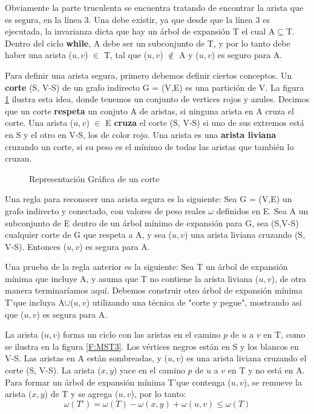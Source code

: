 \documentclass[a4paper, 11pt]{report}
\newcommand{\DrawEJcGraph}[5]{

    \begin{scope}[#4]
    \foreach \pos/\nodo in {{(0,0)/4}, {(0,2.2)/5}, {(1.5,1.7)/7}, {(3,3)/1}, {(3,1)/0}, {(4.5,1.7)/2}, {(4.5,3)/3}, {(7,0)/6}}
        \node[vertex] (#3\nodo) at \pos {\nodo};
    \foreach \start/\end in {4/5, 5/7, 7/1,7/0,0/2,2/3,2/6,4/7,1/5,0/4,1/2,1/3,2/7,3/6,6/0,6/4}
        \path[edge,#5] (#3\start) -- (#3\end);

    \foreach \nodo in {#1}
        \node[selected vertex] at (#3\nodo) {\nodo};

    \begin{pgfonlayer}{background}
        \foreach \start/\end in {#2}
            \path[selected edge,#5] (#3\start) -- (#3\end);
    \end{pgfonlayer}
    \end{scope}

}
\begin{document}
Obviamente la parte truculenta se encuentra tratando de encontrar la arista que es segura, en la línea 3. Una debe existir, ya que desde que la línea 3 es ejecutada, la invarianza dicta que hay un árbol de expansión T el cual A$ \subseteq $T. Dentro del ciclo \textbf{while}, A debe ser un subconjunto de T, y por lo tanto debe haber una arista ($u,v$) $ \in $ T, tal que ($u, v$) $\notin$ A y ($u, v$) es seguro para A.

Para definir una arista segura, primero debemos definir ciertos conceptos. Un \textbf{corte} (S, V-S) de un grafo indirecto G = (V,E) es una partición de V. La figura \ref{MST2} ilustra esta idea, donde tenemos un conjunto de vertices rojos y azules. Decimos que un corte \textbf{respeta} un conjuto A de aristas, si ninguna arista en A cruza el corte. Una arista ($u,v$) $\in$ E \textbf{cruza} el corte (S, V-S) si uno de sus extremos está en S y el otro en V-S, los de color rojo. Una arista es una \textbf{arista liviana} cruzando un corte, si su peso es el mínimo de todas las aristas que también lo cruzan.

\begin{figure}[!h]
    \centering
    \caption{Representaci\'on Gr\'afica de un corte}
    \label{MST2}
\end{figure}

Una regla para reconocer una arista segura es la siguiente: Sea G = (V,E) un grafo indirecto y conectado, con valores de peso reales $\omega$ definidos en E. Sea A un subconjunto de E dentro de un árbol mínimo de expansión para G, sea (S,V-S) cualquier corte de G que respeta a A, y sea ($u, v$) una arista liviana cruzando (S, V-S). Entonces ($u, v$) es segura para A.

Una prueba de la regla anterior es la siguiente:
Sea T un árbol de expansión mínima que incluye A, y asuma que T no contiene la arista liviana ($u,v$), de otra manera terminaríamos aquí. Debemos construir otro árbol de expansión mínima T'que incluya A$\cup${($u,v$)} utilizando una técnica de "corte y pegue", mostrando así que ($u,v$) es segura para A.

La arista ($u, v$) forma un ciclo con las aristas en el camino $p$ de $u$ a $v$ en T, como se ilustra en la figura \ref{F:MST3}. Los vértices negros están en S y los blancos en V-S. Las aristas en A están sombreadas, y ($u, v$) es una arista liviana cruzando el corte (S, V-S). La arista ($x, y$) yace en el camino $p$ de $u$ a $v$ en T y no está en A. Para formar un árbol de expansión mínima T'que contenga ($u, v$), se remueve la arista ($x, y$) de T y se agrega ($u, v$), por lo tanto:
\begin{equation}
\omega(T') = \omega(T) - \omega(x,y) + \omega(u,v)\leq \omega(T) 
\end{equation}
\end{document}
